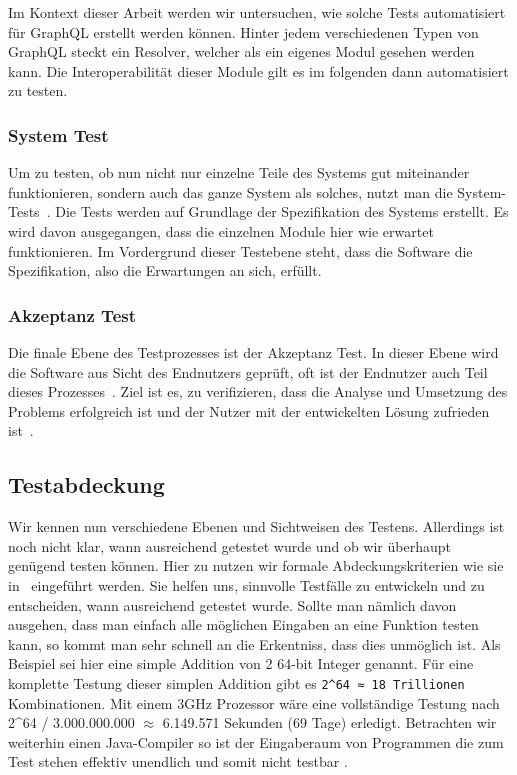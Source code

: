 Im Kontext dieser Arbeit werden wir untersuchen, wie solche Tests automatisiert für GraphQL erstellt werden können.
Hinter jedem verschiedenen Typen von GraphQL steckt ein Resolver, welcher als ein eigenes Modul gesehen werden kann.
Die Interoperabilität dieser Module gilt es im folgenden dann automatisiert zu testen.

\subsubsection{System Test}

Um zu testen, ob nun nicht nur einzelne Teile des Systems gut miteinander funktionieren, sondern auch das ganze System als
solches, nutzt man die System-Tests~\cite[vgl. S. 6]{software-testing}.
Die Tests werden auf Grundlage der Spezifikation des Systems erstellt.
Es wird davon ausgegangen, dass die einzelnen Module hier wie erwartet funktionieren.
Im Vordergrund dieser Testebene steht, dass die Software die Spezifikation, also die Erwartungen an sich, erfüllt.

\subsubsection{Akzeptanz Test}

Die finale Ebene des Testprozesses ist der Akzeptanz Test.
In dieser Ebene wird die Software aus Sicht des Endnutzers geprüft, oft ist der Endnutzer auch Teil dieses Prozesses~\cite[vgl. S.6]{software-testing}.
Ziel ist es, zu verifizieren, dass die Analyse und Umsetzung des Problems erfolgreich ist und der Nutzer mit der entwickelten Lösung
zufrieden ist~\cite[vgl. S.6]{software-testing}.

\subsection{Testabdeckung}

Wir kennen nun verschiedene Ebenen und Sichtweisen des Testens.
Allerdings ist noch nicht klar, wann ausreichend getestet wurde und ob wir überhaupt genügend testen können.
Hier zu nutzen wir formale Abdeckungskriterien wie sie in~\cite{software-testing} eingeführt werden.
Sie helfen uns, sinnvolle Testfälle zu entwickeln und zu entscheiden, wann ausreichend getestet wurde.
Sollte man nämlich davon ausgehen, dass man einfach alle möglichen Eingaben an eine Funktion testen kann, so kommt
man sehr schnell an die Erkentniss, dass dies unmöglich ist.
Als Beispiel sei hier eine simple Addition von 2 64-bit Integer genannt.
Für eine komplette Testung dieser simplen Addition gibt es \verb+2^64 ≈ 18 Trillionen+ Kombinationen.
Mit einem 3GHz Prozessor wäre eine vollständige Testung nach \\ 2^{64} / 3.000.000.000 $ \approx $ 6.149.571 Sekunden (69 Tage) erledigt.
Betrachten wir weiterhin einen Java-Compiler so ist der Eingaberaum von Programmen die zum Test stehen effektiv unendlich und somit nicht testbar \cite[vgl. 1.3 Coverage Criteria for Testing]{software-testing}.

